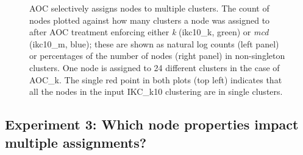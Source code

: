 \documentclass[12pt, oneside]{article}   	%
\begin{document}
\begin{figure}[H]
\begin{subfigure}[t]{0.48\textwidth}
\end{subfigure}
\captionsetup{width=0.9\textwidth}	
\caption{AOC selectively assigns nodes to multiple clusters. The count of nodes plotted against how many clusters a node was assigned to after AOC treatment enforcing either \emph{k} (ikc10\_k, green) or \emph{mcd} (ikc10\_m, blue);  these are shown as natural log counts (left panel) or percentages of the number of nodes (right panel) in non-singleton clusters. One node is assigned to 24 different clusters in the case of AOC\_k. The single red point in both plots (top left) indicates that all the nodes in the input IKC\_k10 clustering are in single clusters.}
\label{fig:fig2}
\end{figure}
	
\subsection{Experiment 3: Which node properties impact multiple assignments?}
\end{document}
